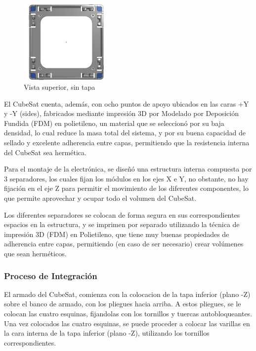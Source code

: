      \begin{figure}
        \centering
        \includegraphics[width=0.4\textwidth]{image/structure/superior.png}
        \caption{Vista superior, sin tapa}
        \label{fig:superior}
      \end{figure}
      El CubeSat cuenta, además, con ocho puntos de apoyo ubicados en las caras +Y y -Y (sides),
      fabricados mediante impresión 3D por Modelado por Deposición Fundida (FDM) en polietileno, un
      material que se seleccionó por su baja densidad, lo cual reduce la masa total del sistema, y por
      su buena capacidad de sellado y excelente adherencia entre capas, permitiendo que la resistencia
      interna del CubeSat sea hermética.

      Para el montaje de la electrónica, se diseñó una estructura interna compuesta por 3 separadores,
      los cuales fijan los módulos en los ejes X e Y, no obstante, no hay fijación en el eje Z para
      permitir el movimiento de los diferentes componentes, lo que permite aprovechar y ocupar todo el
      volumen del CubeSat.

      Los diferentes separadores se colocan de forma segura en sus correspondientes espacios en la
      estructura, y se imprimen por separado utilizando la técnica de impresión 3D (FDM) en Polietileno,
      que tiene muy buenas propiedades de adherencia entre capas, permitiendo (en caso de ser necesario)
      crear volúmenes que sean herméticos.
    \subsubsection{Proceso de Integración}

      El armado del CubeSat, comienza con la colocacion de la tapa inferior (plano -Z) sobre
      el banco de armado, con los pliegues hacia arriba. A estos pliegues, se le colocan las cuatro
      esquinas, fijandolas con los tornillos y tuercas autobloqueantes. Una vez colocados las cuatro
      esquinas, se puede proceder a colocar las varillas en la cara interna de la tapa inferior (plano
      -Z), utilizando los tornillos correspondientes.

